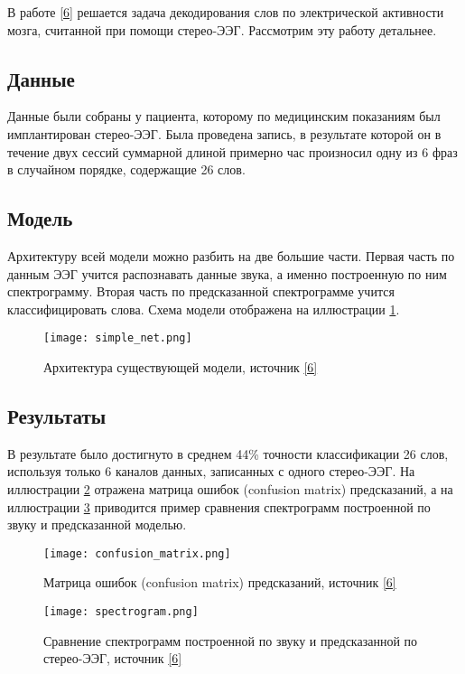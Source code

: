 \documentclass[a4paper,14pt]{extarticle}
\begin{document}
В работе \hyperlink{b_6}{[6]} решается задача декодирования слов по электрической активности мозга, считанной при помощи стерео-ЭЭГ. Рассмотрим эту работу детальнее.

\subsection{Данные}
Данные были собраны у пациента, которому по медицинским показаниям был имплантирован стерео-ЭЭГ. Была проведена запись, в результате которой он в течение двух сессий суммарной длиной примерно час произносил одну из 6 фраз в случайном порядке, содержащие 26 слов. 

\subsection{Модель}
Архитектуру всей модели можно разбить на две большие части. Первая часть по данным ЭЭГ учится распознавать данные звука, а именно построенную по ним спектрограмму. Вторая часть по предсказанной спектрограмме учится классифицировать слова. Схема модели отображена на иллюстрации \ref{fig:simple_net}.

\begin{figure}[H]
	\centering
	\texttt{[image: simple\_net.png]}
	\caption{Архитектура существующей модели, источник \protect\hyperlink{b_6}{[6]} }
	\label{fig:simple_net}
\end{figure}

\subsection{Результаты}

В результате было достигнуто в среднем 44\% точности классификации 26 слов, используя только 6 каналов данных, записанных с одного стерео-ЭЭГ. На иллюстрации \ref{fig:confusion_matrix} отражена матрица ошибок (confusion matrix) предсказаний, а на иллюстрации \ref{fig:spectrogram} приводится пример сравнения спектрограмм построенной по звуку и предсказанной моделью.

\begin{figure}[H]
	\centering
	\texttt{[image: confusion\_matrix.png]}
	\caption{Матрица ошибок (confusion matrix) предсказаний, источник \protect\hyperlink{b_6}{[6]} }
	\label{fig:confusion_matrix}
\end{figure}

\begin{figure}[H]
	\centering
	\texttt{[image: spectrogram.png]}
	\caption{Сравнение спектрограмм построенной по звуку и предсказанной по стерео-ЭЭГ, источник \protect\hyperlink{b_6}{[6]} }
	\label{fig:spectrogram}
\end{figure}
\end{document}
